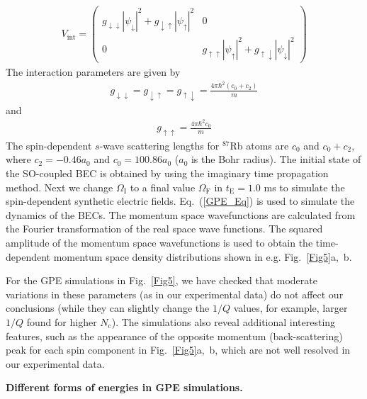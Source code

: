 \documentclass[showpacs,preprintnumbers,amsmath,amssymb, superscriptaddress, aps, reprint]{revtex4-1}
\def\OmegaF{\Omega_{\text{F}}}
\def\OmegaI{\Omega_{\text{I}}}
\begin{document}
{{{\begin{align}
\label{eq_Vint}
V_{\text{int} }=
\begin{pmatrix}
{{g_{ \downarrow  \downarrow }}{{\left| {{\psi _ \downarrow }} \right|}^2} + {g_{ \downarrow  \uparrow }}{{\left| {{\psi _ \uparrow }} \right|}^2}} & 0 \\ 
0 & {{g_{ \uparrow  \uparrow }}{{\left| {{\psi _ \uparrow }} \right|}^2} + {g_{ \uparrow  \downarrow }}{{\left| {{\psi _ \downarrow }} \right|}^2}}
\end{pmatrix}
\end{align}                                  
The interaction parameters are given by 
\begin{align}
g_{ \downarrow \downarrow }=g_{ \downarrow \uparrow }=g_{ \uparrow \downarrow }=\frac{{4\pi {\hbar ^2}\left( {{c_0} + {c_2}} \right)}}{m}
\label{Eq_bareg_c0plusc2}
\end{align}
and
\begin{align}
{g_{ \uparrow  \uparrow }}=\frac{{4\pi {\hbar ^2}{c_0}}}{m}
\label{Eq_bareg_upup_c0}
\end{align}
The spin-dependent $s$-wave scattering lengths for $^{87}$Rb atoms are $c_0$ and $c_0+c_2$, where $c_2 = -0.46a_0$ and $c_0 = 100.86a_0$ ($a_0$ is the Bohr radius). The initial state of the SO-coupled BEC is obtained by using the imaginary time propagation method. Next we change $\OmegaI$ to a final value $\OmegaF$ in $t_{\text{E}} = 1.0$ ms to simulate the spin-dependent synthetic electric fields. Eq.~(\ref{GPE_Eq}) is used to simulate the dynamics of the BECs. The momentum space wavefunctions are calculated from the Fourier transformation of the real space wave functions. {The squared amplitude of the momentum space wavefunctions is used to obtain the time-dependent momentum space density distributions shown in e.g. Fig.~{\ref{Fig5}}a,~b.}

For the GPE simulations in {Fig.~{\ref{Fig5}}}, we have checked that moderate variations in these parameters (as in our experimental data) do not affect our conclusions (while they can slightly change the $1/Q$ values, for example, larger $1/Q$ found for higher $N_{\text{c}}$). The simulations also reveal additional interesting features, such as the appearance of the opposite momentum (back-scattering) peak for each spin component in {Fig.~{\ref{Fig5}}a,~b}, which are not well resolved in our experimental data.  

\vspace{5mm}

\textbf{Different forms of energies in GPE simulations.} 

}}}
\end{document}
